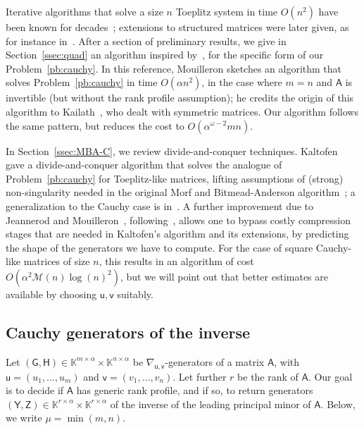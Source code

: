 \documentclass[sigconf]{acmart}
\newcommand{\vu}{\ensuremath{\mathsf{u}}}
\newcommand{\vv}{\ensuremath{\mathsf{v}}}
\newcommand{\mA}{\ensuremath{\mathsf{A}}}
\newcommand{\mG}{\ensuremath{\mathsf{G}}}
\newcommand{\mH}{\ensuremath{\mathsf{H}}}
\newcommand{\mY}{\ensuremath{\mathsf{Y}}}
\newcommand{\mZ}{\ensuremath{\mathsf{Z}}}
\newcommand{\K}{\ensuremath{\mathbb{K}}}
\newcommand{\M}{\ensuremath{\mathscr{M}}}
\newcommand{\mn}{\ensuremath{\mu}}
\theoremstyle{acmdefinition}
\begin{document}
Iterative algorithms that solve a size $n$ Toeplitz system in time
$O(n^2)$ have been known for
decades~\cite{Levinson47,Durbin60,Trench64}; extensions to structured
matrices were later given, as for instance in~\cite{KaGoOl95}. After a
section of preliminary results, we give in Section~\ref{ssec:quad} an
algorithm inspired by~\cite[Algorithme~4]{Mouilleron08}, for the
specific form of our Problem~\ref{pb:cauchy}. In this reference,
Mouilleron sketches an algorithm that solves Problem~\ref{pb:cauchy}
in time $O(\alpha n^2)$, in the case where $m=n$ and $\mA$ is
invertible (but without the rank profile assumption); he credits the
origin of this algorithm to Kailath~\cite[\S1.10]{KaSa99}, who dealt
with symmetric matrices.  Our algorithm follows the same pattern, but
reduces the cost to $O(\alpha^{\omega-2} mn)$.

In Section~\ref{ssec:MBA-C}, we review divide-and-conquer
techniques. Kalt\-ofen~\cite{Kaltofen94} gave a divide-and-conquer
algorithm that solves the analogue of Problem~\ref{pb:cauchy} for
Toeplitz-like matrices, lifting assumptions of (strong)
non-singularity needed in the original Morf and Bitmead-Anderson
algorithm~\cite{Morf80,BiAn80}; a generalization to the Cauchy case is
in~\cite{PaZh00,Cardinal99}.  A further improvement due to Jeannerod
and Mouilleron~\cite{JeMo10}, following~\cite{Cardinal99}, allows one
to bypass costly compression stages that are needed in Kaltofen's
algorithm and its extensions, by predicting the shape of the
generators we have to compute. For the case of square Cauchy-like
matrices of size $n$, this results in an algorithm of cost
$O(\alpha^2 \M(n)\log(n)^2)$, but we will point out that 
better estimates are available by choosing
$\vu,\vv$ suitably.


\vspace{-9px}
\subsection{Cauchy generators of the inverse}\label{ssec:genofinv}

Let $(\mG,\mH) \in \K^{m\times \alpha} \times \K^{n\times \alpha}$ be
$\nabla_{\vu,\vv}$-generators of a matrix $\mA$, with
$\vu=(u_1,\dots,u_m)$ and $\vv=(v_1,\dots,v_n)$. Let further $r$ be
the rank of $\mA$. Our goal is to decide if $\mA$ has generic rank
profile, and if so, to return generators
$(\mY,\mZ) \in \K^{r\times \alpha} \times \K^{r\times \alpha}$ of the
inverse of the leading principal minor of $\mA$.  Below, we write
$\mn=\min(m,n)$.
\end{document}
